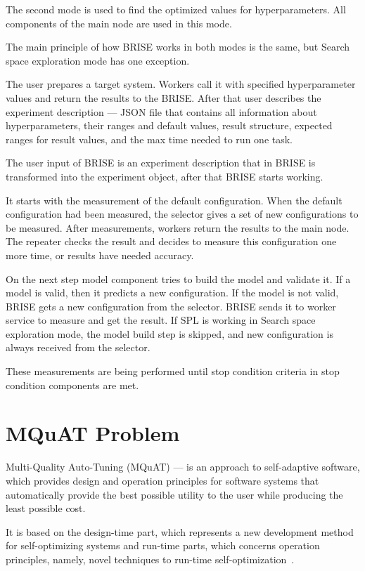 The second mode is used to find the optimized values for hyperparameters. All components of the main node are used in this mode.

The main principle of how BRISE works in both modes is the same, but 
Search space exploration mode has one exception.

The user prepares a target system. Workers call it with specified hyperparameter values and return the results to the BRISE.
After that user describes the experiment description — JSON file that contains all information about hyperparameters, their ranges and default values, result structure, expected ranges for result values, and the max time needed to run one task.

The user input of BRISE is an experiment description that in BRISE is transformed into the experiment object, after that BRISE starts working.

It starts with the measurement of the default configuration. When the default configuration had been measured, the selector gives a set of new configurations to be measured. After measurements, workers return the results to the main node. The repeater checks the result and decides to measure this configuration one more time, or results have needed accuracy. 

On the next step model component tries to build the model and validate it. If a model is valid, then it predicts a new configuration. If the model is not valid, BRISE gets a new configuration from the selector. BRISE sends it to worker service to measure and get the result. If SPL is working in Search space exploration mode, the model build step is skipped, and new configuration is always received from the selector. 

These measurements are being performed until stop condition criteria in stop condition components are met.

\section{MQuAT Problem}
\label{sec:MQuATProblem}

Multi-Quality Auto-Tuning (MQuAT) — is an approach to self-adaptive software, which provides design and operation principles for software systems that automatically provide the best possible utility to the user while producing the least possible cost.

It is based on the design-time part, which represents a new development method for self-optimizing systems and run-time parts, which concerns operation principles, namely,  novel techniques to run-time self-optimization~\cite{gotz13}.


